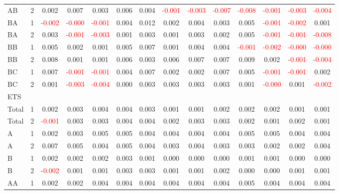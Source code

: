 \begin{table}[!htb]
{\begin{tabular}{llcccccccccccc}
AB & 2 & 0.002 & 0.007 & 0.003 & 0.006 & 0.004 & \textcolor{red}{-0.001} & \textcolor{red}{-0.003} & \textcolor{red}{-0.007} & \textcolor{red}{-0.008} & \textcolor{red}{-0.001} & \textcolor{red}{-0.003} & \textcolor{red}{-0.004}\\
BA & 1 & \textcolor{red}{-0.002} & \textcolor{red}{-0.000} & \textcolor{red}{-0.001} & 0.004 & 0.012 & 0.002 & 0.004 & 0.003 & 0.005 & \textcolor{red}{-0.001} & \textcolor{red}{-0.002} & 0.001\\
BA & 2 & 0.003 & \textcolor{red}{-0.001} & \textcolor{red}{-0.003} & 0.001 & 0.003 & 0.001 & 0.003 & 0.002 & 0.005 & \textcolor{red}{-0.001} & \textcolor{red}{-0.001} & \textcolor{red}{-0.008}\\
BB & 1 & 0.005 & 0.002 & 0.001 & 0.005 & 0.007 & 0.001 & 0.004 & 0.004 & \textcolor{red}{-0.001} & \textcolor{red}{-0.002} & \textcolor{red}{-0.000} & \textcolor{red}{-0.000}\\
BB & 2 & 0.008 & 0.001 & 0.001 & 0.006 & 0.003 & 0.006 & 0.007 & 0.007 & 0.009 & 0.002 & \textcolor{red}{-0.001} & \textcolor{red}{-0.004}\\
BC & 1 & 0.007 & \textcolor{red}{-0.001} & \textcolor{red}{-0.001} & 0.004 & 0.007 & 0.002 & 0.002 & 0.007 & 0.005 & \textcolor{red}{-0.001} & \textcolor{red}{-0.001} & 0.002\\
BC & 2 & 0.001 & \textcolor{red}{-0.003} & \textcolor{red}{-0.004} & 0.000 & 0.003 & 0.003 & 0.003 & 0.003 & 0.001 & \textcolor{red}{-0.000} & 0.001 & \textcolor{red}{-0.002}\\
\hline
ETS &  &  &  &  &  &  &  &  &  &  &  &  & \\
\hline
Total & 1 & 0.002 & 0.003 & 0.004 & 0.004 & 0.003 & 0.001 & 0.001 & 0.002 & 0.002 & 0.002 & 0.001 & 0.001\\
Total & 2 & \textcolor{red}{-0.001} & 0.003 & 0.003 & 0.004 & 0.004 & 0.002 & 0.003 & 0.003 & 0.002 & 0.001 & 0.002 & 0.001\\
A & 1 & 0.002 & 0.003 & 0.005 & 0.005 & 0.004 & 0.004 & 0.004 & 0.004 & 0.005 & 0.005 & 0.004 & 0.004\\
A & 2 & 0.007 & 0.005 & 0.004 & 0.005 & 0.004 & 0.003 & 0.004 & 0.003 & 0.003 & 0.002 & 0.002 & 0.004\\
B & 1 & 0.002 & 0.002 & 0.002 & 0.003 & 0.001 & 0.000 & 0.000 & 0.000 & 0.001 & 0.001 & 0.000 & 0.000\\
B & 2 & \textcolor{red}{-0.002} & 0.001 & 0.001 & 0.003 & 0.003 & 0.001 & 0.001 & 0.002 & 0.000 & 0.000 & 0.001 & 0.001\\
AA & 1 & 0.002 & 0.002 & 0.004 & 0.004 & 0.004 & 0.004 & 0.004 & 0.004 & 0.005 & 0.004 & 0.004 & 0.004\\

\end{tabular}}
\end{table}
